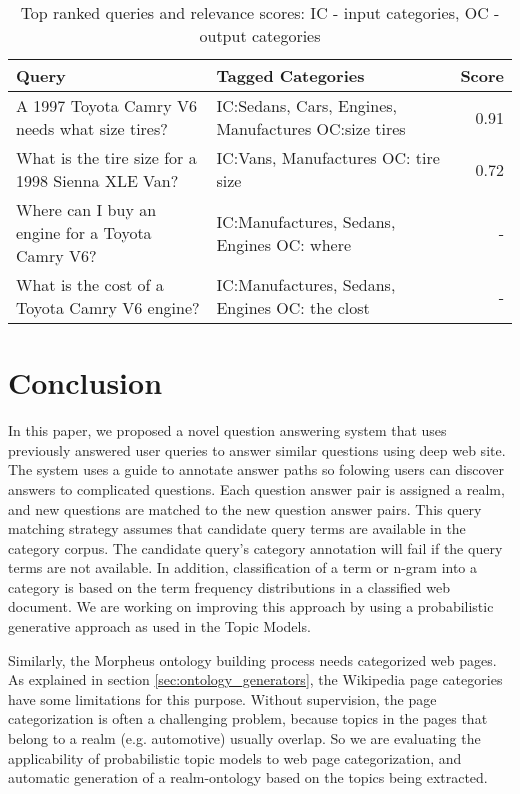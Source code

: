\begin{table}[h]\footnotesize

\begin{tabular}{| p{3.5cm} | p{3cm} | r |}
\hline
Query & Tagged Categories & Score\\ \hline
A 1997 Toyota Camry V6 needs what size tires? & IC:Sedans, Cars, Engines, Manufactures OC:size tires & 0.91\\ \hline 
What is the tire size for a 1998 Sienna XLE Van? & IC:Vans, Manufactures OC: tire size & 0.72\\ \hline 
Where can I buy an engine for a Toyota Camry V6? & IC:Manufactures, Sedans, Engines OC: where & - \\ \hline 
What is the cost of a Toyota Camry V6 engine? &  IC:Manufactures, Sedans, Engines OC: the clost  & - \\ \hline
\end{tabular}        

\caption{Top ranked queries and relevance scores: IC - input categories, OC - output categories}
\label{tbl:ranked_queries}   

\end{table}


\section{Conclusion}

In this paper, we proposed a novel question answering system that uses previously 
answered user queries to answer similar questions using deep web site.  
The system uses a guide to annotate answer paths so folowing users 
can discover answers to complicated questions.  Each question answer pair is 
assigned a realm, and new questions are matched to the new question answer pairs. 
This query matching strategy assumes that candidate query terms are
available in the category corpus. The candidate query's category annotation will
fail if the query terms are not available. In addition, classification of a
term or n-gram into a category is based on the term frequency distributions in a
classified web document. We are working on improving this
approach by using a probabilistic generative approach as used in the Topic
Models\cite{Blei2003latentdirichlet}. 


Similarly, the Morpheus ontology building
process needs categorized web pages. As explained in section
\ref{sec:ontology_generators}, the Wikipedia page categories have some
limitations for this purpose. Without supervision, the page categorization is
often a challenging problem, because topics in the pages that belong to a realm
(e.g. automotive) usually overlap. So we are evaluating the applicability of
probabilistic topic models to web page categorization, and automatic
generation of a realm-ontology based on the topics being extracted.            
 


